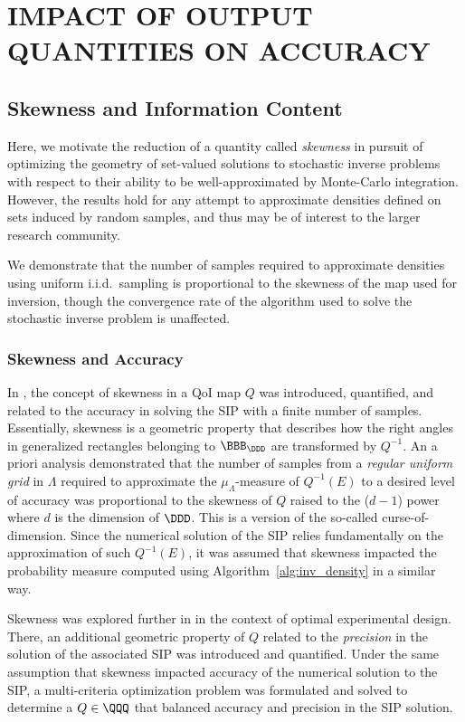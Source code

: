 \chapter{\uppercase{Impact of Output Quantities on Accuracy} \label{chapter:03}}

\section{Skewness and Information Content}
Here, we motivate the reduction of a quantity called \emph{skewness} in pursuit of optimizing the geometry of set-valued solutions to stochastic inverse problems with respect to their ability to be well-approximated by Monte-Carlo integration. 
However, the results hold for any attempt to approximate densities defined on sets induced by random samples, and thus may be of interest to the larger research community. 

We demonstrate that the number of samples required to approximate densities using uniform i.i.d.~sampling is proportional to the skewness of the map used for inversion, though the convergence rate of the algorithm used to solve the stochastic inverse problem is unaffected. 


\subsection{Skewness and Accuracy}\label{subsec:skewness}
In \cite{BGE+15}, the concept of skewness in a QoI map $Q$ was introduced, quantified, and related to the accuracy in solving the SIP with a finite number of samples.
Essentially, skewness is a geometric property that describes how the right angles in generalized rectangles belonging to $\BBB_\DDD$ are transformed by $Q^{-1}$. 
An a priori analysis demonstrated that the number of samples from a {\em regular uniform grid} in $\Lambda$ required to approximate the $\mu_\Lambda$-measure of $Q^{-1}(E)$ to a desired level of accuracy was proportional to the skewness of $Q$ raised to the ($d-1$) power where $d$ is the dimension of $\DDD$.
This is a version of the so-called curse-of-dimension.
Since the numerical solution of the SIP relies fundamentally on the approximation of such $Q^{-1}(E)$, it was assumed that skewness impacted the probability measure computed using Algorithm~\ref{alg:inv_density} in a similar way.

Skewness was explored further in \cite{BPW17} in the context of optimal experimental design.
There, an additional geometric property of $Q$ related to the {\em precision} in the solution of the associated SIP was introduced and quantified. 
Under the same assumption that skewness impacted accuracy of the numerical solution to the SIP, a multi-criteria optimization problem was formulated and solved to determine a $Q\in\QQQ$ that balanced accuracy and precision in the SIP solution.

